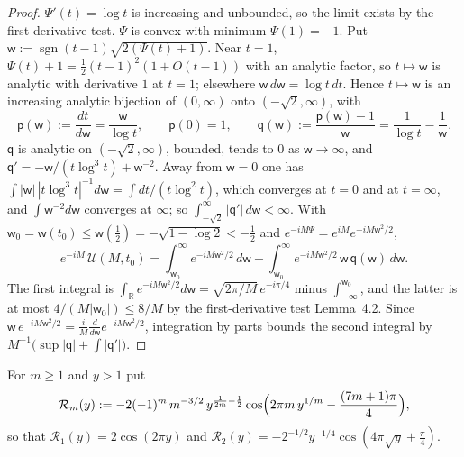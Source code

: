 \documentclass[11pt,reqno]{amsart}
\makeatletter
\let\CG@origcite\cite
\renewcommand*{\cite}[2][]{\def\CG@citekey{#2}%
  \ifx\relax#1\relax\CG@origcite{#2}\else\CG@origcite[#1]{#2}\fi}
\numberwithin{equation}{section}
\theoremstyle{plain}
\theoremstyle{definition}
\theoremstyle{remark}
\newcommand{\R}{\mathbb R}
\makeatother
\begin{document}
\begin{proof}
$\Psi'(t)=\log t$ is increasing and unbounded, so the limit exists by the first-derivative test.  $\Psi$ is convex with minimum $\Psi(1)=-1$.  Put $\mathsf w:=\operatorname{sgn}(t-1)\sqrt{2(\Psi(t)+1)}$.  Near $t=1$, $\Psi(t)+1=\frac12(t-1)^2(1+O(t-1))$ with an analytic factor, so $t\mapsto\mathsf w$ is analytic with derivative $1$ at $t=1$; elsewhere $\mathsf w\,d\mathsf w=\log t\,dt$.  Hence $t\mapsto\mathsf w$ is an increasing analytic bijection of $(0,\infty)$ onto $(-\sqrt2,\infty)$, with
\begin{equation}\label{eq:U-substitution}
 \mathsf p(\mathsf w):=\frac{dt}{d\mathsf w}=\frac{\mathsf w}{\log t},\qquad \mathsf p(0)=1,\qquad \mathsf q(\mathsf w):=\frac{\mathsf p(\mathsf w)-1}{\mathsf w}=\frac1{\log t}-\frac1{\mathsf w}.
\end{equation}
$\mathsf q$ is analytic on $(-\sqrt2,\infty)$, bounded, tends to $0$ as $\mathsf w\to\infty$, and $\mathsf q'=-\mathsf w/(t\log^3t)+\mathsf w^{-2}$.  Away from $\mathsf w=0$ one has $\int|\mathsf w|\,|t\log^3t|^{-1}d\mathsf w=\int dt/(t\log^2t)$, which converges at $t=0$ and at $t=\infty$, and $\int\mathsf w^{-2}d\mathsf w$ converges at $\infty$; so $\int_{-\sqrt2}^\infty|\mathsf q'|\,d\mathsf w<\infty$.  With $\mathsf w_0=\mathsf w(t_0)\le\mathsf w(\frac12)=-\sqrt{1-\log2}<-\frac12$ and $e^{-iM\Psi}=e^{iM}e^{-iM\mathsf w^2/2}$,
\begin{equation}\label{eq:U-split}
 e^{-iM}\,\mathcal U(M,t_0)=\int_{\mathsf w_0}^\infty e^{-iM\mathsf w^2/2}\,d\mathsf w+\int_{\mathsf w_0}^\infty e^{-iM\mathsf w^2/2}\,\mathsf w\,\mathsf q(\mathsf w)\,d\mathsf w .
\end{equation}
The first integral is $\int_{\R}e^{-iM\mathsf w^2/2}d\mathsf w=\sqrt{2\pi/M}\,e^{-i\pi/4}$ minus $\int_{-\infty}^{\mathsf w_0}$, and the latter is at most $4/(M|\mathsf w_0|)\le8/M$ by the first-derivative test \cite[Lemma~4.2]{Titchmarsh1986}.  Since $\mathsf w\,e^{-iM\mathsf w^2/2}=\frac iM\frac d{d\mathsf w}e^{-iM\mathsf w^2/2}$, integration by parts bounds the second integral by $M^{-1}\bigl(\sup|\mathsf q|+\int|\mathsf q'|\bigr)$.
\end{proof}

For $m\ge1$ and $y>1$ put
\begin{equation}\label{eq:clock-harmonic}
 \mathcal R_m(y):=-2(-1)^m\,m^{-3/2}\,y^{\frac1{2m}-\frac12}\cos\Bigl(2\pi m\,y^{1/m}-\frac{(7m+1)\pi}4\Bigr),
\end{equation}
so that $\mathcal R_1(y)=2\cos(2\pi y)$ and $\mathcal R_2(y)=-2^{-1/2}y^{-1/4}\cos(4\pi\sqrt y+\frac\pi4)$.
\end{document}
